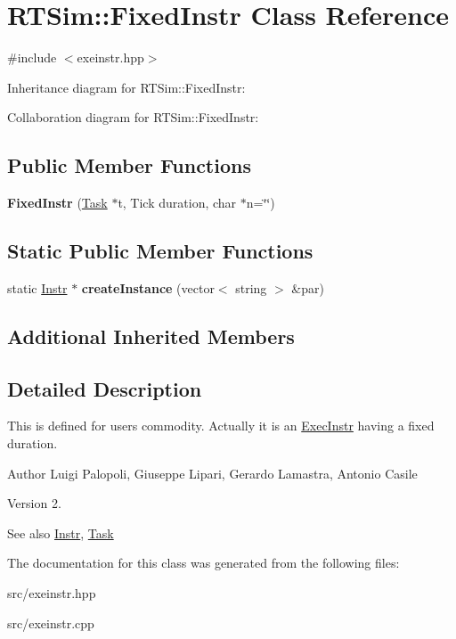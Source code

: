 \hypertarget{classRTSim_1_1FixedInstr}{}\section{R\+T\+Sim\+:\+:Fixed\+Instr Class Reference}
\label{classRTSim_1_1FixedInstr}


{\ttfamily \#include $<$exeinstr.\+hpp$>$}



Inheritance diagram for R\+T\+Sim\+:\+:Fixed\+Instr\+:


Collaboration diagram for R\+T\+Sim\+:\+:Fixed\+Instr\+:
\subsection*{Public Member Functions}
\begin{DoxyCompactItemize}
\item 
{\bfseries Fixed\+Instr} (\hyperlink{classRTSim_1_1Task}{Task} $\ast$t, Tick duration, char $\ast$n=\char`\"{}\char`\"{})\hypertarget{classRTSim_1_1FixedInstr_a65fe1021cc936ec147cc52aefcacd37f}{}\label{classRTSim_1_1FixedInstr_a65fe1021cc936ec147cc52aefcacd37f}

\end{DoxyCompactItemize}
\subsection*{Static Public Member Functions}
\begin{DoxyCompactItemize}
\item 
static \hyperlink{classRTSim_1_1Instr}{Instr} $\ast$ {\bfseries create\+Instance} (vector$<$ string $>$ \&par)\hypertarget{classRTSim_1_1FixedInstr_afcb92bb72ca9cc6b17e9ea102fc09b4a}{}\label{classRTSim_1_1FixedInstr_afcb92bb72ca9cc6b17e9ea102fc09b4a}

\end{DoxyCompactItemize}
\subsection*{Additional Inherited Members}


\subsection{Detailed Description}
This is defined for user\textquotesingle{}s commodity. Actually it is an \hyperlink{classRTSim_1_1ExecInstr}{Exec\+Instr} having a fixed duration. \begin{DoxyAuthor}{Author}
Luigi Palopoli, Giuseppe Lipari, Gerardo Lamastra, Antonio Casile 
\end{DoxyAuthor}
\begin{DoxyVersion}{Version}
2. 
\end{DoxyVersion}
\begin{DoxySeeAlso}{See also}
\hyperlink{classRTSim_1_1Instr}{Instr}, \hyperlink{classRTSim_1_1Task}{Task} 
\end{DoxySeeAlso}


The documentation for this class was generated from the following files\+:\begin{DoxyCompactItemize}
\item 
src/exeinstr.\+hpp\item 
src/exeinstr.\+cpp\end{DoxyCompactItemize}
